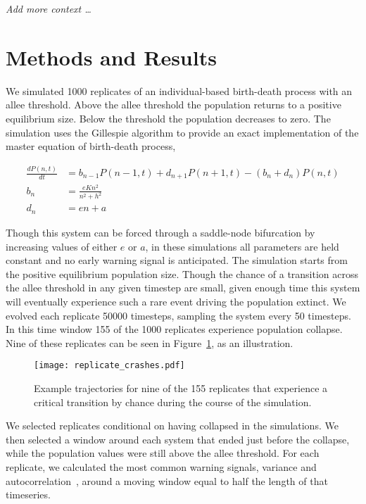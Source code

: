 \documentclass[authoryear,review,12pt]{elsarticle}
\begin{document}
 


\emph{Add more context \dots }


\section{Methods and Results}
We simulated 1000 replicates of an individual-based birth-death process
with an allee threshold.  Above the allee threshold the population returns
to a positive equilibrium size.  Below the threshold the population decreases
to zero. The simulation uses the Gillespie algorithm to provide an exact 
implementation of the master equation of birth-death process,

\begin{align}
  \frac{dP(n,t)}{dt} &= b_{n-1} P(n-1,t) + d_{n+1}P(n+1,t) - (b_n+d_n) P(n,t)  \label{master} \\
    b_n &= \frac{e K n^2}{n^2 + h^2} \\
    d_n &= e n + a
\end{align}

Though this system can be forced through a saddle-node bifurcation by
increasing values of either $e$ or $a$, in these simulations all parameters
are held constant and no early warning signal is anticipated.
The simulation starts from the positive equilibrium population size.
Though the chance of a transition across the allee threshold in any 
given timestep are small, given enough time this system will eventually
experience such a rare event driving the population extinct.  We evolved
each replicate 50000 timesteps, sampling the system every 50 timesteps.  
In this time window 155 of the 1000 replicates experience population collapse.  
Nine of these replicates can be seen in Figure~\ref{fig:replicate_crashes},
as an illustration. 

  \begin{figure}[H]
    \begin{center}
      \texttt{[image: replicate\_crashes.pdf]}
    \end{center}
    \caption{Example trajectories for nine of the 155 replicates that 
             experience a critical transition by chance during the course
             of the simulation.}
    \label{fig:replicate_crashes}
  \end{figure}


We selected replicates conditional on having collapsed in the simulations.
We then selected a window around each system that ended just before the
collapse, while the population values were still above the allee threshold.
For each replicate, we calculated the most common warning signals, variance
and autocorrelation~\citep[\emph{e.g.}][]{Carpenter2006,Dakos2008,Scheffer2009}, 
around a moving window equal to half the length of that timeseries.  
\end{document}
